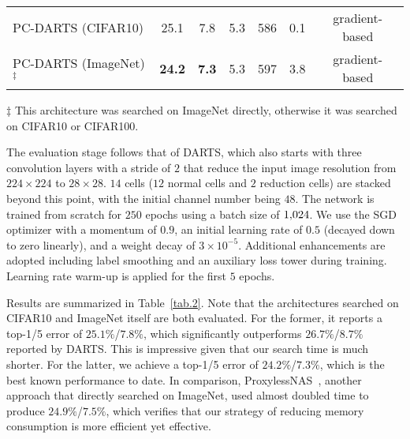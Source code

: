 \documentclass{article} \usepackage{iclr2020_conference,times}
\begin{document}
\begin{table}[t]
\begin{threeparttable}[b]
{\begin{tabular}{@{}lcccccc@{}}
\midrule
PC-DARTS (CIFAR10)                    & 25.1 & 7.8  & 5.3 & 586  & 0.1  & gradient-based \\
PC-DARTS (ImageNet)$^\ddagger$        & \textbf{24.2} &\textbf{7.3}  & 5.3 & 597  & 3.8 & gradient-based \\
\bottomrule			
\end{tabular}
}
\begin{tablenotes}
\item[$\ddagger$] {\footnotesize This architecture was searched on ImageNet directly, otherwise it was searched on CIFAR10 or CIFAR100.}
\end{tablenotes}
\end{threeparttable}
\end{table}

The evaluation stage follows that of DARTS, which also starts with three convolution layers with a stride of $2$ that reduce the input image resolution from $224\times224$ to $28\times28$. $14$ cells ($12$ normal cells and $2$ reduction cells) are stacked beyond this point, with the initial channel number being $48$. The network is trained from scratch for $250$ epochs using a batch size of $1\rm{,}024$. We use the SGD optimizer with a momentum of $0.9$, an initial learning rate of $0.5$ (decayed down to zero linearly), and a weight decay of $3\times10^{-5}$. Additional enhancements are adopted including label smoothing and an auxiliary loss tower during training. Learning rate warm-up is applied for the first $5$ epochs.

Results are summarized in Table~\ref{tab.2}. Note that the architectures searched on CIFAR10 and ImageNet itself are both evaluated. For the former, it reports a top-1/5 error of $25.1\%$/$7.8\%$, which significantly outperforms $26.7\%$/$8.7\%$ reported by DARTS. This is impressive given that our search time is much shorter. For the latter, we achieve a top-1/5 error of $24.2\%$/$7.3\%$, which is the best known performance to date. In comparison, ProxylessNAS~\citep{cai2018proxylessnas}, another approach that directly searched on ImageNet, used almost doubled time to produce $24.9\%$/$7.5\%$, which verifies that our strategy of reducing memory consumption is more efficient yet effective.
\end{document}
